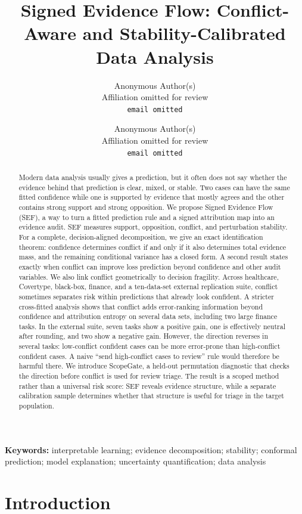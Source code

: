 \documentclass[11pt]{article}
\title{Signed Evidence Flow: Conflict-Aware and Stability-Calibrated Data Analysis}
\author{
Anonymous Author(s)\\
Affiliation omitted for review\\
\texttt{email omitted}
\and
Anonymous Author(s)\\
Affiliation omitted for review\\
\texttt{email omitted}
}
\date{}
\begin{document}
\maketitle

\begin{abstract}
Modern data analysis usually gives a prediction, but it often does not say whether the evidence behind that prediction is clear, mixed, or stable. Two cases can have the same fitted confidence while one is supported by evidence that mostly agrees and the other contains strong support and strong opposition. We propose Signed Evidence Flow (SEF), a way to turn a fitted prediction rule and a signed attribution map into an evidence audit. SEF measures support, opposition, conflict, and perturbation stability. For a complete, decision-aligned decomposition, we give an exact identification theorem: confidence determines conflict if and only if it also determines total evidence mass, and the remaining conditional variance has a closed form. A second result states exactly when conflict can improve loss prediction beyond confidence and other audit variables. We also link conflict geometrically to decision fragility. Across healthcare, Covertype, black-box, finance, and a ten-data-set external replication suite, conflict sometimes separates risk within predictions that already look confident. A stricter cross-fitted analysis shows that conflict adds error-ranking information beyond confidence and attribution entropy on several data sets, including two large finance tasks. In the external suite, seven tasks show a positive gain, one is effectively neutral after rounding, and two show a negative gain. However, the direction reverses in several tasks: low-conflict confident cases can be more error-prone than high-conflict confident cases. A naive ``send high-conflict cases to review'' rule would therefore be harmful there. We introduce ScopeGate, a held-out permutation diagnostic that checks the direction before conflict is used for review triage. The result is a scoped method rather than a universal risk score: SEF reveals evidence structure, while a separate calibration sample determines whether that structure is useful for triage in the target population.
\end{abstract}

\noindent\textbf{Keywords:} interpretable learning; evidence decomposition; stability; conformal prediction; model explanation; uncertainty quantification; data analysis

\section{Introduction}
\end{document}
